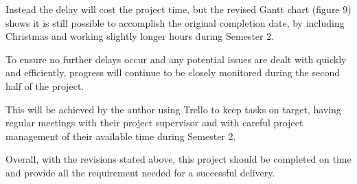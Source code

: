 \documentclass[progress]{cmpreport}
\begin{document}
Instead the delay will cost the project time, but the revised Gantt chart (figure 9) shows it is still possible to accomplish the original completion date, by including Christmas and working slightly longer hours during Semester 2.

To ensure no further delays occur and any potential issues are dealt with quickly and efficiently, progress will continue to be closely monitored during the second half of the project. 

This will be achieved by the author using Trello to keep tasks on target, having regular meetings with their project supervisor and with careful project management of their available time during Semester 2.

Overall, with the revisions stated above, this project should be completed on time and provide all the requirement needed for a successful delivery.
\end{document}
